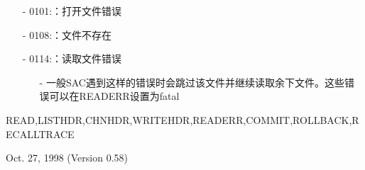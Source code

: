 \begin{itemize}
\item[-]0101:：打开文件错误
\item[-]0108:：文件不存在
\item[-]0114:：读取文件错误
	\begin{itemize}
	\item[-]一般SAC遇到这样的错误时会跳过该文件并继续读取余下文件。这些错误可以在READERR设置为fatal
	\end{itemize}
\end{itemize}

READ,LISTHDR,CHNHDR,WRITEHDR,READERR,COMMIT,ROLLBACK,RECALLTRACE

Oct. 27, 1998 (Version 0.58)
